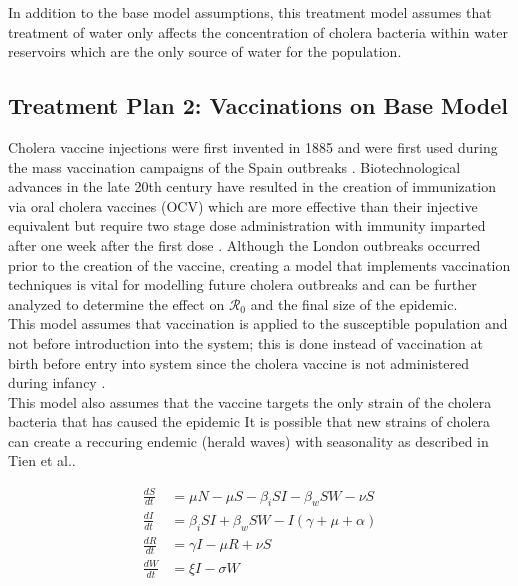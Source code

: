 \documentclass[12pt]{article}\usepackage[]{graphicx}\usepackage[]{color}
\begin{document}
In addition to the base model assumptions, this treatment model assumes that treatment of water only affects the concentration of cholera bacteria within water reservoirs which are the only source of water for the population.

\subsection{Treatment Plan 2: Vaccinations on Base Model}
Cholera vaccine injections were first invented in 1885 and were first used during the mass vaccination campaigns of the Spain outbreaks \citep{link21}.
Biotechnological advances in the late 20th century have resulted in the creation of immunization via oral cholera vaccines (OCV) which are more effective than their injective equivalent but require two stage dose administration with immunity imparted after one week after the first dose \citep{link21} \citep{link25}.
Although the London outbreaks occurred prior to the creation of the vaccine, creating a model that implements vaccination techniques is vital for modelling future cholera outbreaks and can be further analyzed to determine the effect on $\mathcal R_0$ and the final size of the epidemic.\\
This model assumes that vaccination is applied to the susceptible population and not before introduction into the system; this is done instead of vaccination at birth before entry into system since the cholera vaccine is not administered during infancy \citep{link25}.\\
This model also assumes that the vaccine targets the only strain of the cholera bacteria that has caused the epidemic %
It is possible that new strains of cholera can create a reccuring endemic (herald waves) with seasonality as described in Tien et al.\citep{link3}.

\begin{linenomath}
\begin{align*}
	\frac{dS}{dt}&= \mu N - \mu S - \beta_i SI - \beta_w S W - \nu S \\
	\frac{dI}{dt}&= \beta_i S I + \beta_w S W - I (\gamma + \mu + \alpha) \\
	\frac{dR}{dt}&= \gamma I - \mu R + \nu S\\
	\frac{dW}{dt}&= \xi I  - \sigma W\\
\end{align*}
\end{linenomath}
\end{document}
